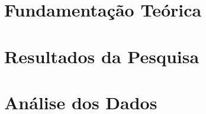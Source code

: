 \documentclass
[
  12pt,      %
  openright, %
  twoside,   %
  a4paper,   %
  brazil     %
]{cls/tccUFRB}
\begin{document}
%
  \frenchspacing %
%
  

  \textual 

  

  \part{Fundamentação Teórica}
    
  \part{Resultados da Pesquisa}
  \part{Análise dos Dados}

% 
  

  \postextual

  \nocite{*}
  \printbibliography

\end{document}
